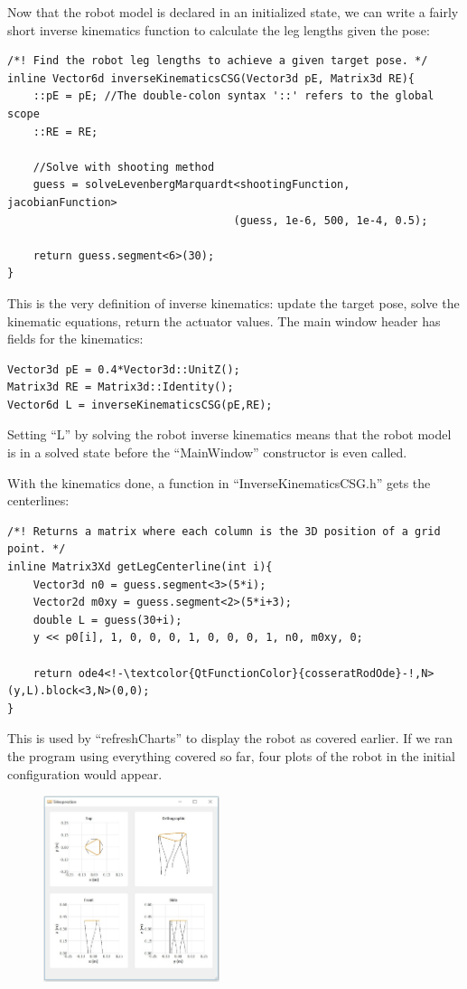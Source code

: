 \documentclass[12pt]{article}
\begin{document}
Now that the robot model is declared in an initialized state, we can write a fairly short inverse kinematics function to calculate the leg lengths given the pose:
\begin{lstlisting}
/*! Find the robot leg lengths to achieve a given target pose. */
inline Vector6d inverseKinematicsCSG(Vector3d pE, Matrix3d RE){
    ::pE = pE; //The double-colon syntax '::' refers to the global scope
    ::RE = RE;

    //Solve with shooting method
    guess = solveLevenbergMarquardt<shootingFunction, jacobianFunction>
                                   (guess, 1e-6, 500, 1e-4, 0.5);

    return guess.segment<6>(30);
}
\end{lstlisting}
This is the very definition of inverse kinematics: update the target pose, solve the kinematic equations, return the actuator values. The main window header has fields for the kinematics:
\begin{lstlisting}
Vector3d pE = 0.4*Vector3d::UnitZ();
Matrix3d RE = Matrix3d::Identity();
Vector6d L = inverseKinematicsCSG(pE,RE);
\end{lstlisting}
Setting ``L'' by solving the robot inverse kinematics means that the robot model is in a solved state before the ``MainWindow'' constructor is even called.

With the kinematics done, a function in ``InverseKinematicsCSG.h'' gets the centerlines:
\begin{lstlisting}
/*! Returns a matrix where each column is the 3D position of a grid point. */
inline Matrix3Xd getLegCenterline(int i){
    Vector3d n0 = guess.segment<3>(5*i);
    Vector2d m0xy = guess.segment<2>(5*i+3);
    double L = guess(30+i);
    y << p0[i], 1, 0, 0, 0, 1, 0, 0, 0, 1, n0, m0xy, 0;

    return ode4<!-\textcolor{QtFunctionColor}{cosseratRodOde}-!,N>(y,L).block<3,N>(0,0);
}
\end{lstlisting}
This is used by ``refreshCharts'' to display the robot as covered earlier. If we ran the program using everything covered so far, four plots of the robot in the initial configuration would appear.
\begin{figure}[h]
	\centering
		\includegraphics[width=0.46\textwidth]{fig/Home.jpg}
\end{figure}
\end{document}
